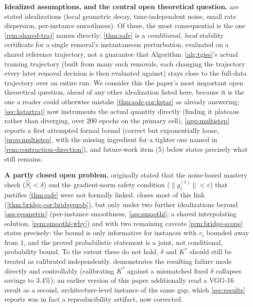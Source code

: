 \documentclass{article}
\theoremstyle{plain}
\theoremstyle{definition}
\theoremstyle{remark}
\begin{document}
\textbf{Idealized assumptions, and the central open theoretical question.}  are stated idealizations (local geometric decay, time-independent noise, small rate dispersion, per-instance smoothness). Of these, the most consequential is the one \cref{rem:shared-traj} names directly: \cref{thm:safe} is a \emph{conditional, local} stability certificate for a single removal's instantaneous perturbation, evaluated on a shared reference trajectory, not a guarantee that Algorithm~\ref{alg:tgies}'s actual training trajectory (built from many such removals, each changing the trajectory every later removal decision is then evaluated against) stays close to the full-data trajectory over an entire run. We consider this the paper's most important open theoretical question, ahead of any other idealization listed here, because it is the one a reader could otherwise mistake \cref{thm:safe,cor:kstar} as already answering; \cref{sec:kstartraj} now instruments the actual quantity directly (finding it plateaus rather than diverging, over $200$ epochs on the primary cell), \cref{app:multistep} reports a first attempted formal bound (correct but exponentially loose, \cref{prop:multistep}, with the missing ingredient for a tighter one named in \cref{rem:contraction-direction}), and future-work item (5) below states precisely what still remains.

\textbf{A partly closed open problem.}  originally stated that the noise-based mastery check ($\hat S_i<\delta$) and the gradient-norm safety condition ($\|g_i^{(t)}\|<\varepsilon$) that justifies \cref{thm:safe} were not formally linked.  closes most of this link (\cref{thm:bridge,cor:bridgeprob}), but only under two further idealizations beyond \cref{ass:geometric} (per-instance smoothness, \cref{ass:smoothi}; a shared interpolating solution, \cref{rem:smoothi-why}) and with two remaining caveats \cref{rem:bridge-scope} states precisely: the bound is only informative for instances with $r_i$ bounded away from $1$, and the proved probabilistic statement is a joint, not conditional, probability bound. To the extent these do not hold, $\delta$ and $K^*$ should still be treated as calibrated independently.  demonstrates the resulting failure mode directly and controllably (calibrating $K^*$ against a mismatched fixed $\delta$ collapses savings to $3.4\%$); an earlier version of this paper additionally read a VGG-16 result as a second, architecture-level instance of the same gap, which \cref{sec:results} reports was in fact a reproducibility artifact, now corrected.
\end{document}

